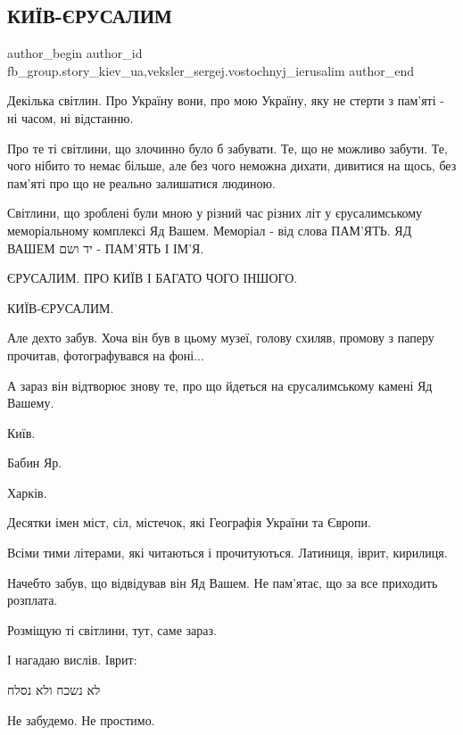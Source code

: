  
 
 
 
 
 
\subsection{КИЇВ-ЄРУСАЛИМ}
\label{sec:06_03_2022.fb.fb_group.story_kiev_ua.1.kiev_jerusalim}
 
\ifcmt
 author_begin
   author_id fb_group.story_kiev_ua,veksler_sergej.vostochnyj_ierusalim
 author_end
\fi

Декілька світлин. Про Україну вони, про мою Україну, яку не стерти з пам'яті -
ні часом, ні відстанню.


Про те ті світлини, що злочинно було б забувати. Те, що не можливо забути. Те,
чого нібито то немає більше, але без чого неможна дихати, дивитися на щось, без
пам'яті про що не реально залишатися людиною.


Світлини, що зроблені були мною у різний час різних літ у єрусалимському
меморіальному комплексі Яд Вашем. Меморіал - від слова ПАМ'ЯТЬ. ЯД ВАШЕМ יד ושם
- ПАМ'ЯТЬ І ІМ'Я.


ЄРУСАЛИМ. ПРО КИЇВ І БАГАТО ЧОГО ІНШОГО. 

КИЇВ-ЄРУСАЛИМ.

Але дехто забув. Хоча він був в цьому музеї, голову схиляв, промову з паперу
прочитав, фотографувався на фоні... 


А зараз він відтворює знову те, про що йдеться на єрусалимському камені Яд
Вашему. 

Київ.

Бабин Яр.

Харків. 

Десятки імен міст, сіл, містечок, які Географія України та Європи.

Всіми тими літерами, які читаються і прочитуються. Латиниця, іврит, кирилиця.

Начебто забув, що відвідував він Яд Вашем. Не пам'ятає, що за все приходить
розплата.

Розміщую ті світлини, тут, саме зараз.

І нагадаю вислів. Іврит:

לא נשכח ולא נסלח

Не забудемо. Не простимо.
